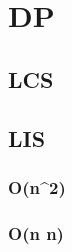 %         

%         

\section{DP}
    \subsection{LCS}
        
    \subsection{LIS}
        \subsubsection{O(n^2)}
             
        \subsubsection{O(n \log n)}
            
            